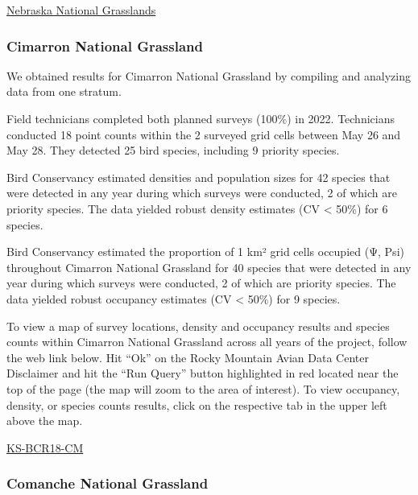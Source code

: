 \documentclass[
  letterpaper,
  DIV=11,
  numbers=noendperiod,
  oneside]{scrreprt}
\begin{document}
\href{http://www.rmbo.org/new_site/adc/QueryWindow.aspx\#N4IgzgrgDgpgTmALnAhoiBbEAuABCAORgCNUwBrFXAtASwHsA7FAG1wHEywWVGATMCAC+QA=}{Nebraska
National Grasslands}

\hypertarget{cimarron-national-grassland}{%
\subsubsection{Cimarron National
Grassland}\label{cimarron-national-grassland}}

We obtained results for Cimarron National Grassland by compiling and
analyzing data from one stratum.

Field technicians completed both planned surveys (100\%) in 2022.
Technicians conducted 18 point counts within the 2 surveyed grid cells
between May 26 and May 28. They detected 25 bird species, including 9
priority species.

Bird Conservancy estimated densities and population sizes for 42 species
that were detected in any year during which surveys were conducted, 2 of
which are priority species. The data yielded robust density estimates
(CV \textless{} 50\%) for 6 species.

Bird Conservancy estimated the proportion of 1 km² grid cells occupied
(Ψ, Psi) throughout Cimarron National Grassland for 40 species that were
detected in any year during which surveys were conducted, 2 of which are
priority species. The data yielded robust occupancy estimates (CV
\textless{} 50\%) for 9 species.

To view a map of survey locations, density and occupancy results and
species counts within Cimarron National Grassland across all years of
the project, follow the web link below. Hit ``Ok'' on the Rocky Mountain
Avian Data Center Disclaimer and hit the ``Run Query'' button
highlighted in red located near the top of the page (the map will zoom
to the area of interest). To view occupancy, density, or species counts
results, click on the respective tab in the upper left above the map.

\href{http://www.rmbo.org/new_site/adc/QueryWindow.aspx\#N4IgzgLgTghhCuBbEAuABCA0gZQLQCEBhAJQEYAOXQgWXUIEtEYooB7AOzQDk56OYANmgDisMGAEx2AExABfIA==}{KS-BCR18-CM}

\hypertarget{comanche-national-grassland}{%
\subsubsection{Comanche National
Grassland}\label{comanche-national-grassland}}
\end{document}
